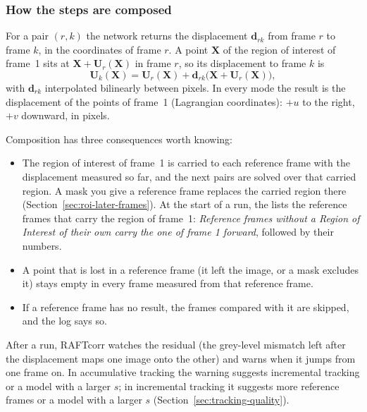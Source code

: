 \subsubsection*{How the steps are composed}

For a pair $(r, k)$ the network returns the displacement $\mathbf{d}_{rk}$ from frame $r$ to
frame $k$, in the coordinates of frame $r$. A point $\mathbf{X}$ of the region of interest of
frame~1 sits at $\mathbf{X} + \mathbf{U}_r(\mathbf{X})$ in frame $r$, so its displacement to
frame $k$ is
\begin{equation*}
  \mathbf{U}_k(\mathbf{X}) = \mathbf{U}_r(\mathbf{X})
      + \mathbf{d}_{rk}\bigl(\mathbf{X} + \mathbf{U}_r(\mathbf{X})\bigr),
\end{equation*}
with $\mathbf{d}_{rk}$ interpolated bilinearly between pixels. In every mode the result is the
displacement of the points of frame~1 (Lagrangian coordinates): $+u$ to the right, $+v$
downward, in pixels.

Composition has three consequences worth knowing:
\begin{itemize}
  \item The region of interest of frame~1 is carried to each reference frame with the
        displacement measured so far, and the next pairs are solved over that carried region.
        A mask you give a reference frame replaces the carried region there
        (Section~\ref{sec:roi-later-frames}). At the start of a run, the  lists the
        reference frames that carry the region of frame~1: \emph{Reference frames without a
        Region of Interest of their own carry the one of frame 1 forward}, followed by their
        numbers.
  \item A point that is lost in a reference frame (it left the image, or a mask excludes it)
        stays empty in every frame measured from that reference frame.
  \item If a reference frame has no result, the frames compared with it are skipped, and the
        log says so.
\end{itemize}

\begin{notebox}
After a run, RAFTcorr watches the residual (the grey-level mismatch left after the
displacement maps one image onto the other) and warns when it jumps from one frame on. In
accumulative tracking the warning suggests incremental tracking or a model with a larger $s$;
in incremental tracking it suggests more reference frames or a model with a larger $s$
(Section~\ref{sec:tracking-quality}).
\end{notebox}

